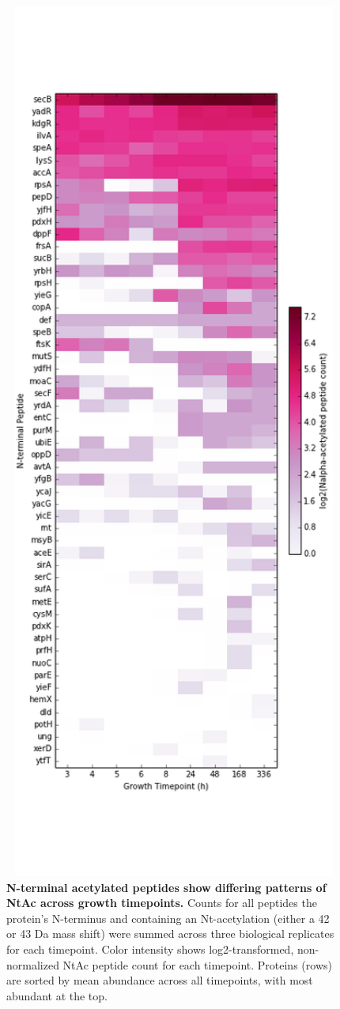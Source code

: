 \documentclass[12pt]{article}
\begin{document}
\clearpage
\begin{figure}[p]
\centerline{\includegraphics[width=5in]{Figures/AcetylatedProteins.png}}
\caption{\label{fig:Acet}\textbf{N-terminal acetylated peptides show differing patterns of NtAc across growth timepoints.} Counts for all peptides the protein's N-terminus and containing an Nt-acetylation (either a 42 or 43 Da mass shift) were summed across three biological replicates for each timepoint.  Color intensity shows log2-transformed, non-normalized NtAc peptide count for each timepoint. Proteins (rows) are sorted by mean abundance across all timepoints, with most abundant at the top.}
\end{figure}
\end{document}
